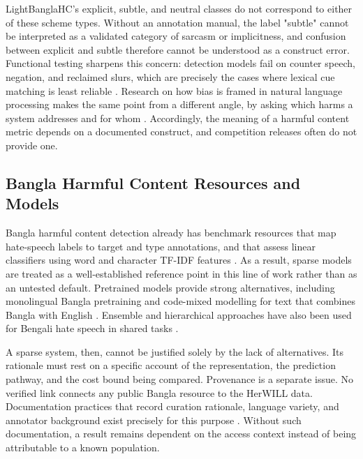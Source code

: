 \documentclass[runningheads]{llncs}
\begin{document}
LightBanglaHC’s explicit, subtle, and neutral classes do not correspond to either of these scheme types. Without an annotation manual, the label "subtle" cannot be interpreted as a validated category of sarcasm or implicitness, and confusion between explicit and subtle therefore cannot be understood as a construct error. Functional testing sharpens this concern: detection models fail on counter speech, negation, and reclaimed slurs, which are precisely the cases where lexical cue matching is least reliable . Research on how bias is framed in natural language processing makes the same point from a different angle, by asking which harms a system addresses and for whom . Accordingly, the meaning of a harmful content metric depends on a documented construct, and competition releases often do not provide one.

\subsection{Bangla Harmful Content Resources and Models}
\label{sec:rw-bangla}

Bangla harmful content detection already has benchmark resources that map hate-speech labels to target and type annotations, and that assess linear classifiers using word and character TF-IDF features . As a result, sparse models are treated as a well-established reference point in this line of work rather than as an untested default. Pretrained models provide strong alternatives, including monolingual Bangla pretraining  and code-mixed modelling for text that combines Bangla with English . Ensemble and hierarchical approaches have also been used for Bengali hate speech in shared tasks .

A sparse system, then, cannot be justified solely by the lack of alternatives. Its rationale must rest on a specific account of the representation, the prediction pathway, and the cost bound being compared. Provenance is a separate issue. No verified link connects any public Bangla resource to the HerWILL data. Documentation practices that record curation rationale, language variety, and annotator background exist precisely for this purpose . Without such documentation, a result remains dependent on the access context instead of being attributable to a known population.
\end{document}
